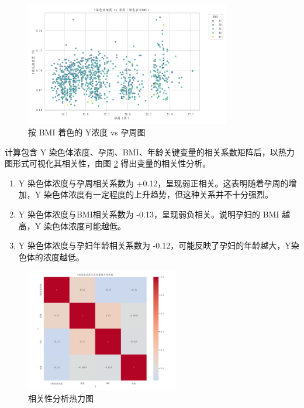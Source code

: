 \documentclass[withoutpreface,bwprint]{cumcmthesis} %
\begin{document}
\begin{figure}[H]
    \centering
    \includegraphics[width=0.8\textwidth]{../figure/C1_Output/q1_scatter_y_vs_gw_by_bmi.png}
    \caption{按 BMI 着色的 Y浓度 vs 孕周图}
    \label{fig:YandWbyBMI}
\end{figure}
计算包含 Y 染色体浓度、孕周、BMI、年龄关键变量的相关系数矩阵后，以热力图形式可视化其相关性，由图 \ref{fig:heatmap} 得出变量的相关性分析。

\begin{enumerate}
    \item Y 染色体浓度与孕周相关系数为 +0.12，呈现弱正相关。这表明随着孕周的增加，Y 染色体浓度有一定程度的上升趋势，但这种关系并不十分强烈。
    \item Y 染色体浓度与BMI相关系数为 -0.13，呈现弱负相关。说明孕妇的 BMI 越高，Y 染色体浓度可能越低。
    \item Y 染色体浓度与孕妇年龄相关系数为 -0.12，可能反映了孕妇的年龄越大，Y染色体的浓度越低。
\end{enumerate}

\begin{figure}[H]
    \centering
    \includegraphics[width=0.6\textwidth]{../figure/C1_Output/q1_correlation_heatmap.png}
    \caption{相关性分析热力图}
    \label{fig:heatmap}
\end{figure}
\end{document}
